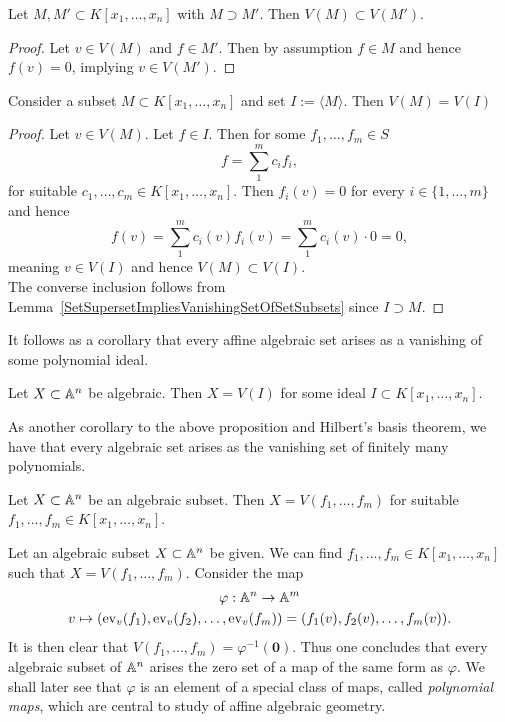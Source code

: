 \begin{lemma}\label{SetSupersetImpliesVanishingSetOfSetSubsets}
    Let $M,M'\subset K[x_1,\dots,x_n]$ with $M\supset M'$. Then $V(M)\subset V(M')$.
\end{lemma}
\begin{proof}
    Let $v\in V(M)$ and $f\in M'$. Then by assumption $f\in M$ and hence $f(v)=0$, implying $v\in V(M')$. 
\end{proof}
\begin{proposition}\label{EveryVanishingSetIsAVanishingSetOverIdeal}
    Consider a subset $M\subset K[x_1,\dots,x_n]$ and set $I:= \langle M\rangle$. Then $V(M)=V(I)$
\end{proposition}
\begin{proof}
    Let $v\in V(M)$. Let $f\in I$. Then for some $f_1,\dots,f_m\in S$ 
    $$f = \sum_1^m c_if_i,$$
    for suitable $c_1,\dots,c_m\in K[x_1,\dots,x_n]$. Then $f_i(v) = 0$ for every $i\in\{1,\dots,m\}$ and hence 
    $$f(v)=\sum_1^m c_i(v)f_i(v) = \sum_1^m c_i(v)\cdot 0 = 0,$$
    meaning $v\in V(I)$ and hence $V(M)\subset V(I)$.\\
    The converse inclusion follows from Lemma~\ref{SetSupersetImpliesVanishingSetOfSetSubsets} since $I\supset M$.  
\end{proof}
It follows as a corollary that every affine algebraic set arises as a vanishing of some polynomial ideal.
\begin{corollary}\label{AlgebraicSubsetArisesAsVanishingSetOfIdeal}
    Let $X\subset \mathbb{A}^n$ be algebraic. Then $X=V(I)$ for some ideal $I\subset K[x_1,\dots,x_n]$.
\end{corollary}
As another corollary to the above proposition and Hilbert's basis theorem, we have that every algebraic set arises as the vanishing set of finitely many polynomials. 
\begin{corollary}\label{AlgebraicSubsetArisesAsVanishingSetOfFiniteSet}
    Let $X\subset \mathbb{A}^n$ be an algebraic subset. Then $X = V(f_1,\dots,f_m)$ for suitable $f_1,\dots,f_m\in K[x_1,\dots,x_n]$.
\end{corollary}
\begin{remark}\label{AlgebraicSubsetIsZeroSetOfPolynomialMap}
    Let an algebraic subset $X\subset \mathbb{A}^n$ be given. We can find $f_1,\dots,f_m\in K[x_1,\dots,x_n]$ such that $X=V(f_1,\dots,f_m)$. Consider the map 
    \begin{gather*}
        \varphi: \mathbb{A}^n \rightarrow \mathbb{A}^m\\
        v\mapsto \left(\mathrm{ev}_v(f_1),\mathrm{ev}_v(f_2),\dots,\mathrm{ev}_v(f_m)\right) = (f_1(v),f_2(v),\dots,f_m(v)).
    \end{gather*}
    It is then clear that $V(f_1,\dots,f_m)=\varphi^{-1}(\textbf{0})$. Thus one concludes that every algebraic subset of $\mathbb{A}^n$ arises the zero set of a map of the same form as $\varphi$. We shall later see that $\varphi$ is an element of a special class of maps, called \textit{polynomial maps}, which are central to study of affine algebraic geometry. 
\end{remark}
